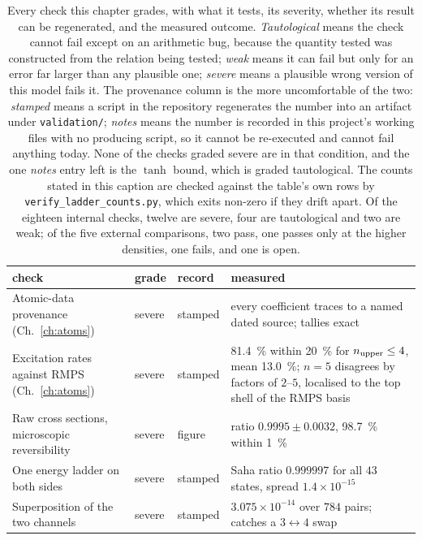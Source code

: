 \begin{table}[tbp]
\centering
\caption[The validation ladder, graded by severity and provenance]{Every check
this chapter grades, with what it tests, its severity, whether its result can be
regenerated, and the measured outcome. \emph{Tautological} means the check
cannot fail except on an arithmetic bug, because the quantity tested was
constructed from the relation being tested; \emph{weak} means it can fail but
only for an error far larger than any plausible one; \emph{severe} means a
plausible wrong version of this model fails it. The provenance column is the
more uncomfortable of the two: \emph{stamped} means a script in the repository
regenerates the number into an artifact under \texttt{validation/};
\emph{notes} means the number is recorded in this project's working files with
no producing script, so it cannot be re-executed and cannot fail anything today.
None of the checks graded severe are in that condition, and the one
\emph{notes} entry left is the $\tanh$ bound, which is graded tautological. The
counts stated in this caption are checked against the table's own rows by
\texttt{verify\_ladder\_counts.py}, which exits non-zero if they drift apart. Of the eighteen
internal checks, twelve are severe, four are tautological and two are weak; of the five external comparisons, two
pass, one passes only at the higher densities, one fails, and one is open.}
\label{tab:ladder}
\footnotesize
\begin{tabular}{p{3.9cm}p{1.8cm}p{1.3cm}p{5.6cm}}
\toprule
check & grade & record & measured \\
\midrule
Atomic-data provenance (Ch.~\ref{ch:atoms})  & severe & stamped & every coefficient traces to a named dated source; tallies exact \\
Excitation rates against RMPS (Ch.~\ref{ch:atoms}) & severe & stamped & \SI{81.4}{\percent} within \SI{20}{\percent} for $n_{\rm upper}\le4$, mean \SI{13.0}{\percent}; $n=5$ disagrees by factors of $2$--$5$, localised to the top shell of the RMPS basis \\
Raw cross sections, microscopic reversibility & severe & figure & ratio $0.9995 \pm 0.0032$, \SI{98.7}{\percent} within \SI{1}{\percent} \\
One energy ladder on both sides & severe & stamped & Saha ratio $0.999997$ for all $43$ states, spread $1.4\times10^{-15}$ \\
Superposition of the two channels & severe & stamped & $3.075\times10^{-14}$ over $784$ pairs; catches a $3\leftrightarrow4$ swap \\

\end{tabular}
\end{table}

